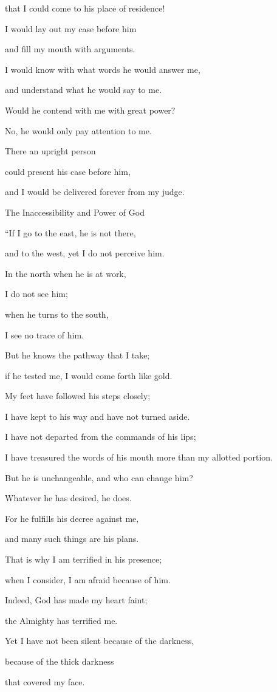 {\par }{\Q that I could come
to his place of residence!
\par }{\Q {}I would lay out my case
before
him
\par }{\Q and fill
my mouth
with arguments.
\par }{\Q {}I would know
with what words
he would answer
me,
\par }{\Q and understand
what
he would say to me.
\par }{\Q {}Would
he contend
with me with
great
power?
\par }{\Q No,
he would only
pay
attention
to me.
\par }{\Q {}There
an upright
person
\par }{\Q could present his case
before him,
\par }{\Q and I would be delivered
forever
from my judge.
\par }{\SH The Inaccessibility and Power of God
\par }{\Q {}“If
I go
to the east,
he is not
there,
\par }{\Q and to the west,
yet I do not
perceive him.
\par }{\Q {}In the north
when he is at
work,

\par }{\Q I do
not
see
him;

\par }{\Q when he turns to the south,
\par }{\Q I see
no
trace of him.
\par }{\Q {}But
he knows
the pathway
that I take;
\par }{\Q if he tested
me, I would come forth
like gold.
\par }{\Q {}My feet
have followed
his steps
closely;
\par }{\Q I have kept
to his way
and have not
turned aside.
\par }{\Q {}I have not
departed
from the commands
of his lips;
\par }{\Q I have treasured
the words
of his mouth
more than my allotted portion.
\par }{\Q {}But he is
unchangeable,
and who can
change
him?
\par }{\Q Whatever he has
desired,
he does.
\par }{\Q {}For
he fulfills
his decree
against me,

\par }{\Q and many
such things are his plans.
\par }{\Q {}That is why
I am terrified
in his presence;
\par }{\Q when I consider,
I am afraid because of him.
\par }{\Q {}Indeed, God
has made my heart
faint;
\par }{\Q the Almighty
has terrified me.
\par }{\Q {}Yet
I have not
been silent
because of the darkness,
\par }{\Q because of the thick darkness
\par }{\Q that covered
my face.


}
